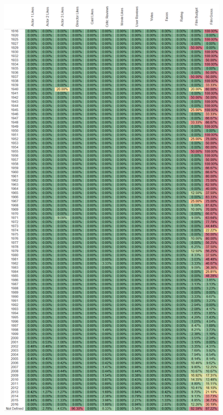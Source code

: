 \documentclass{article}
\begin{document}
\clearpage

\begin{figure}[h]
\centering
\includegraphics[height=0.78\textheight,clip,keepaspectratio]{./images/dataset_quality_metrics}
\label{fig:imdb_num_films_per_year}
\end{figure}
\end{document}
